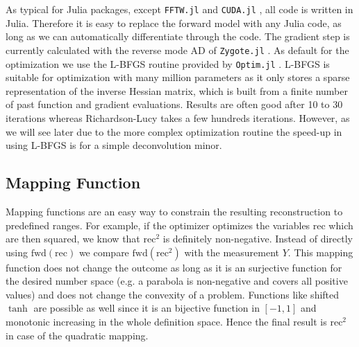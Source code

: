 \documentclass{juliacon}
\begin{document}
As typical for Julia packages, except \verb|FFTW.jl| and \verb|CUDA.jl| \cite{besard2018juliagpu}, all code is written in Julia.
Therefore it is easy to replace the forward model with any Julia code, as long as we can 
automatically differentiate through the code. The gradient step is currently calculated with the reverse mode AD of \verb|Zygote.jl| \cite{Zygote.jl-2018}. 
As default for the optimization we use the L-BFGS \cite{LBFGS} routine provided by \verb|Optim.jl| \cite{mogensen2018optim}.
L-BFGS is suitable for optimization with many million parameters as it only stores a sparse representation of the inverse Hessian matrix,
which is built from a finite number of past function and gradient evaluations. 
Results are often good after 10 to 30 iterations whereas Richardson-Lucy takes
a few hundreds iterations. 
However, as we will see later due to the more complex optimization routine the speed-up in using L-BFGS is for a simple 
deconvolution minor.



\subsection{Mapping Function}
    Mapping functions are an easy way to constrain the resulting reconstruction to predefined ranges.
    For example, if the optimizer optimizes the variables $\text{rec}$ which are then squared, we know that
    $\text{rec}^2$ is definitely non-negative. Instead of directly using $\text{fwd}(\text{rec})$ we compare
    $\text{fwd}(\text{rec}^2)$ with the measurement $Y$. This mapping function does not change the outcome as long
    as it is an surjective function for the desired number space (e.g. a parabola is non-negative and covers all positive values) 
    and does not change the convexity of a problem.
    Functions like shifted $\tanh$ are possible as well since it is an bijective function in $[-1, 1]$ and monotonic increasing
    in the whole definition space.
    Hence the final result is $\text{rec}^2$ in case of the quadratic mapping.
\end{document}

